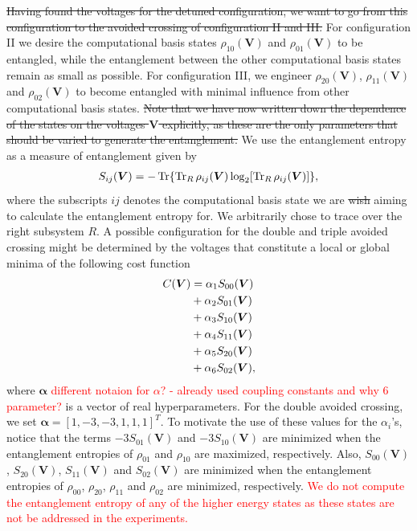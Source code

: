 \documentclass[twocolumn,superscriptaddress,unsortedaddress,
 amsmath,amssymb,
 aps,
]{revtex4-2}
\begin{document}
        \st{Having found the voltages for the detuned configuration, we want to go from this configuration to the avoided crossing of configuration II and III.} For configuration II we desire the computational basis states $\rho_{10}(\boldsymbol{V})$ and $\rho_{01}(\boldsymbol{V})$ to be entangled, while the entanglement between the other computational basis states remain as small as possible. For configuration III, we engineer $\rho_{20}(\boldsymbol{V})$, $\rho_{11}(\boldsymbol{V})$ and $\rho_{02}(\boldsymbol{V})$ to become entangled with minimal influence from other computational basis states. \st{Note that we have now written down the dependence of the states on the voltages $\boldsymbol{V}$ explicitly, as these are the only parameters that should be varied to generate the entanglement.} We use the entanglement entropy as a measure of entanglement given by
        \begin{align*}
            S_{ij}(\boldsymbol{V}) = -\Tr{\Tr_R{\rho_{ij}(\boldsymbol{V})}\log_2[\Tr_R{\rho_{ij}(\boldsymbol{V})]}},
        \end{align*}
        where the subscripts $ij$ denotes the computational basis state we are \st{wish} aiming to calculate the entanglement entropy for. We arbitrarily chose to trace over the right subsystem $R$.
        A possible configuration for the double and triple avoided crossing might be determined by the voltages that constitute a local or global minima of the following cost function
        \begin{align*}
            C(\boldsymbol{V}) &= \alpha_1 S_{00}(\boldsymbol{V}) \notag \\
            &+ \alpha_2 S_{01}(\boldsymbol{V}) \notag \\
            &+ \alpha_3 S_{10}(\boldsymbol{V}) \notag \\
            &+ \alpha_4 S_{11}(\boldsymbol{V}) \notag \\
            &+ \alpha_5 S_{20}(\boldsymbol{V}) \notag \\
            &+ \alpha_6 S_{02}(\boldsymbol{V}),
        \end{align*}
        where $\boldsymbol{\alpha}$ \textcolor{red}{different notaion for $\alpha$? - already used coupling constants and why 6 parameter?} is a vector of real hyperparameters. For the double avoided crossing, we set $\boldsymbol{\alpha} = [1,-3,-3,1,1,1]^T$. To motivate the use of these values for the $\alpha_i$'s, notice that the terms $-3 S_{01}(\boldsymbol{V})$ and $-3 S_{10}(\boldsymbol{V})$ are minimized when the entanglement entropies of $\rho_{01}$ and $\rho_{10}$ are maximized, respectively. Also, $S_{00}(\boldsymbol{V})$, $S_{20}(\boldsymbol{V})$, $S_{11}(\boldsymbol{V})$ and $S_{02}(\boldsymbol{V})$ are minimized when the entanglement entropies of $\rho_{00}$, $\rho_{20}$, $\rho_{11}$ and $\rho_{02}$ are minimized, respectively. \textcolor{red}{We do not compute the entanglement entropy of any of the higher energy states as these states are not be addressed in the experiments.}
\end{document}
